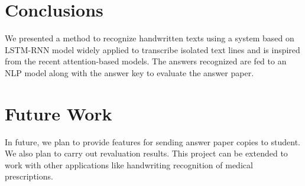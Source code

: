 \section{Conclusions}
We presented a method to recognize handwritten texts using a system based on LSTM-RNN 
model widely applied to transcribe isolated text lines and is inspired from the recent
attention-based models. The answers recognized are fed to an NLP model along with the answer
key to evaluate the answer paper. 
\section{Future Work}
In future, we plan to provide features for sending answer
paper copies to student. We also plan to carry out revaluation results. This project can be
extended to work with other applications like handwriting recognition of medical prescriptions. 
